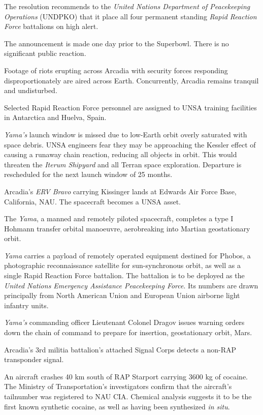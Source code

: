 The resolution recommends to the {\it United Nations Department of Peacekeeping Operations} (UNDPKO) that it place all four permanent standing {\it Rapid Reaction Force} battalions on high alert.

The announcement is made one day prior to the Superbowl. There is no significant public reaction.
\StopTimelineDate

Footage of riots erupting across Arcadia with security forces responding disproportionately are aired across Earth. Concurrently, Arcadia remains tranquil and undisturbed.
\StopTimelineDate

Selected Rapid Reaction Force personnel are assigned to UNSA training facilities in Antarctica and Huelva, Spain.
\StopTimelineDate

{\it Yama's} launch window is missed due to low-Earth orbit overly saturated with space debris. UNSA engineers fear they may be approaching the Kessler effect of causing a runaway chain reaction, reducing all objects in orbit. This would threaten the {\it Iterum Shipyard} and all Terran space exploration. Departure is rescheduled for the next launch window of 25 months.
\StopTimelineDate

Arcadia's {\it ERV Bravo} carrying Kissinger lands at Edwards Air Force Base, California, NAU. The spacecraft becomes a UNSA asset.
\StopTimelineDate

The {\it Yama}, a manned and remotely piloted spacecraft, completes a type I Hohmann transfer orbital manoeuvre, aerobreaking into Martian geostationary orbit. 

{\it Yama} carries a payload of remotely operated equipment destined for Phobos, a photographic reconnaissance satellite for sun-synchronous orbit, as well as a single Rapid Reaction Force battalion. The battalion is to be deployed as the {\it United Nations Emergency Assistance Peacekeeping Force}. Its numbers are drawn principally from North American Union and European Union airborne light infantry units.
\StopTimelineDate

{\it Yama's} commanding officer Lieutenant Colonel Dragov issues warning orders down the chain of command to prepare for insertion, geostationary orbit, Mars.
\StopTimelineDate

Arcadia's 3rd militia battalion's attached Signal Corps detects a non-RAP transponder signal.
\StopTimelineDate

An aircraft crashes 40 km south of RAP Starport carrying 3600 kg of cocaine. The Ministry of Transportation's investigators confirm that the aircraft's tailnumber was registered to NAU CIA. Chemical analysis suggests it to be the first known synthetic cocaine, as well as having been synthesized {\it in situ}.
\StopTimelineDate

\stoplines

\StopChapter

